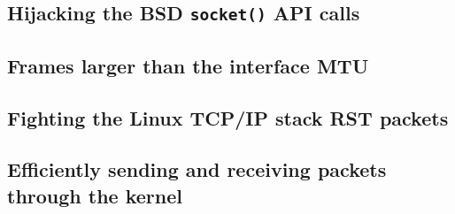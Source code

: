 \documentclass[10pt,a4paper,british]{bhamarticle}
\begin{document}
\subsection{Hijacking the BSD \texttt{socket()} API calls} %
% 

\subsection{Frames larger than the interface MTU}

\subsection{Fighting the Linux TCP/IP stack RST packets}

\subsection{Efficiently sending and receiving packets through the kernel~\cite{tpacket}}

\printbibliography{}
\end{document}
